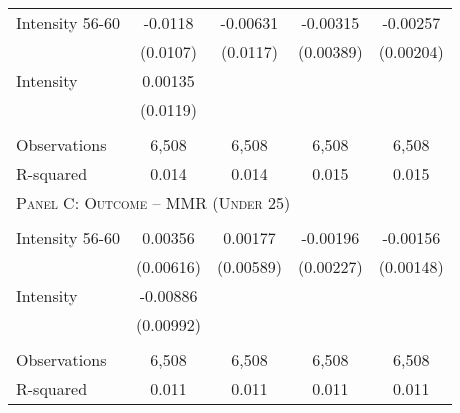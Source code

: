 \begin{subtables}
\begin{table}[htpb!]
\begin{center}
\begin{tabular}{p{5cm}cccc}
Intensity 56-60&-0.0118&-0.00631&-0.00315&-0.00257\\ 
               &(0.0107)&(0.0117)&(0.00389)&(0.00204)\\ 
Intensity      &0.00135&&&\\ 
               &(0.0119)&&&\\ 
\begin{footnotesize}\end{footnotesize}&\begin{footnotesize}\end{footnotesize}&\begin{footnotesize}\end{footnotesize}&\begin{footnotesize}\end{footnotesize}\\ 
Observations&6,508&6,508&6,508&6,508\\ 
R-squared&0.014&0.014&0.015&0.015\\ \midrule 
\multicolumn{5}{l}{\textsc{Panel C: Outcome -- MMR (Under 25)}}\\ 
\begin{footnotesize}\end{footnotesize}&\begin{footnotesize}\end{footnotesize}&\begin{footnotesize}\end{footnotesize}&\begin{footnotesize}\end{footnotesize}\\ 
Intensity 56-60&0.00356&0.00177&-0.00196&-0.00156\\ 
               &(0.00616)&(0.00589)&(0.00227)&(0.00148)\\ 
Intensity      &-0.00886&&&\\ 
               &(0.00992)&&&\\ 
\begin{footnotesize}\end{footnotesize}&\begin{footnotesize}\end{footnotesize}&\begin{footnotesize}\end{footnotesize}&\begin{footnotesize}\end{footnotesize}\\ 
Observations&6,508&6,508&6,508&6,508\\ 
R-squared&0.011&0.011&0.011&0.011\\ 

\end{tabular}
\end{center}
\end{table}
\end{subtables}
